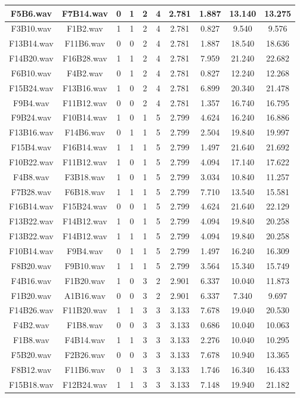 \documentclass[11pt,a4paper]{book}
\begin{document}
\begin{longtable}[c]{|c|c|c|c|c|c|c|c|c|c|}
F5B6.wav&F7B14.wav&0&1&2&4&2.781&1.887&13.140&13.275\\ \hline
F3B10.wav&F1B2.wav&1&1&2&4&2.781&0.827&9.540&9.576\\ \hline
F13B14.wav&F11B6.wav&0&0&2&4&2.781&1.887&18.540&18.636\\ \hline
F14B20.wav&F16B28.wav&1&1&2&4&2.781&7.959&21.240&22.682\\ \hline
F6B10.wav&F4B2.wav&0&1&2&4&2.781&0.827&12.240&12.268\\ \hline
F15B24.wav&F13B16.wav&1&0&2&4&2.781&6.899&20.340&21.478\\ \hline
F9B4.wav&F11B12.wav&0&0&2&4&2.781&1.357&16.740&16.795\\ \hline
F9B24.wav&F10B14.wav&1&0&1&5&2.799&4.624&16.240&16.886\\ \hline
F13B16.wav&F14B6.wav&0&1&1&5&2.799&2.504&19.840&19.997\\ \hline
F15B4.wav&F16B14.wav&1&1&1&5&2.799&1.497&21.640&21.692\\ \hline
F10B22.wav&F11B12.wav&1&0&1&5&2.799&4.094&17.140&17.622\\ \hline
F4B8.wav&F3B18.wav&1&0&1&5&2.799&3.034&10.840&11.257\\ \hline
F7B28.wav&F6B18.wav&1&1&1&5&2.799&7.710&13.540&15.581\\ \hline
F16B14.wav&F15B24.wav&0&0&1&5&2.799&4.624&21.640&22.129\\ \hline
F13B22.wav&F14B12.wav&1&0&1&5&2.799&4.094&19.840&20.258\\ \hline
F13B22.wav&F14B12.wav&1&1&1&5&2.799&4.094&19.840&20.258\\ \hline
F10B14.wav&F9B4.wav&0&1&1&5&2.799&1.497&16.240&16.309\\ \hline
F8B20.wav&F9B10.wav&1&1&1&5&2.799&3.564&15.340&15.749\\ \hline
F4B16.wav&F1B20.wav&1&0&3&2&2.901&6.337&10.040&11.873\\ \hline
F1B20.wav&A1B16.wav&0&0&3&2&2.901&6.337&7.340&9.697\\ \hline
F14B26.wav&F11B20.wav&1&1&3&3&3.133&7.678&19.040&20.530\\ \hline
F4B2.wav&F1B8.wav&0&0&3&3&3.133&0.686&10.040&10.063\\ \hline
F1B8.wav&F4B14.wav&1&1&3&3&3.133&2.276&10.040&10.295\\ \hline
F5B20.wav&F2B26.wav&0&0&3&3&3.133&7.678&10.940&13.365\\ \hline
F8B12.wav&F11B6.wav&0&1&3&3&3.133&1.746&16.340&16.433\\ \hline
F15B18.wav&F12B24.wav&1&1&3&3&3.133&7.148&19.940&21.182\\ \hline

\end{longtable}
\end{document}
